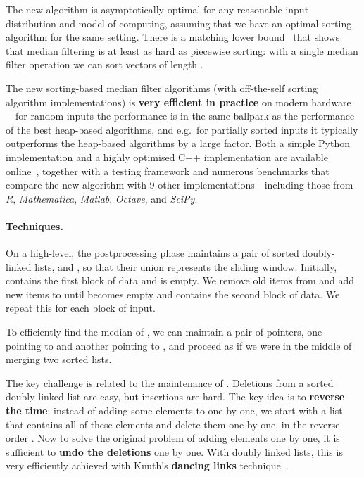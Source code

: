 \documentclass[a4paper,11pt]{article}
\begin{document}
The new algorithm is asymptotically optimal for any reasonable input distribution and model of computing, assuming that we have an optimal sorting algorithm for the same setting. There is a matching lower bound~\cite{juhola91comparison,krizanc05range-mode} that shows that median filtering is at least as hard as piecewise sorting: with a single median filter operation we can sort  vectors of length .

The new sorting-based median filter algorithms (with off-the-self sorting algorithm implementations) is \textbf{very efficient in practice} on modern hardware---for random inputs the performance is in the same ballpark as the performance of the best heap-based algorithms, and e.g.\ for partially sorted inputs it typically outperforms the heap-based algorithms by a large factor. Both a simple Python implementation and a highly optimised C++ implementation are available online~, together with a testing framework and numerous benchmarks that compare the new algorithm with 9 other implementations---including those from \emph{R}, \emph{Mathematica}, \emph{Matlab}, \emph{Octave}, and \emph{SciPy}.

\paragraph{Techniques.}

On a high-level, the postprocessing phase maintains a pair of sorted doubly-linked lists,  and , so that their union  represents the sliding window. Initially,  contains the first block of data and  is empty. We remove old items from  and add new items to  until  becomes empty and  contains the second block of data. We repeat this for each block of input.

To efficiently find the median of , we can maintain a pair of pointers, one pointing to  and another pointing to , and proceed as if we were in the middle of merging two sorted lists.

The key challenge is related to the maintenance of . Deletions from a sorted doubly-linked list are easy, but insertions are hard. The key idea is to \textbf{reverse the time}: instead of adding some elements  to  one by one, we start with a list that contains all of these elements and delete them one by one, in the reverse order . Now to solve the original problem of adding elements one by one, it is sufficient to \textbf{undo the deletions} one by one. With doubly linked lists, this is very efficiently achieved with Knuth's \textbf{dancing links} technique~\cite{knuth00dancinglinks}.
\end{document}

